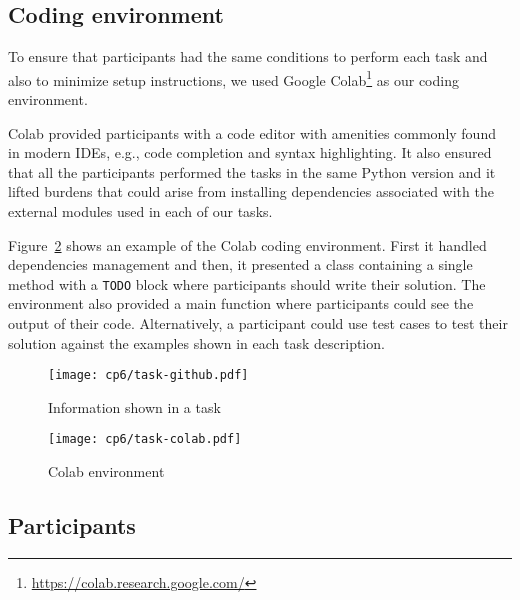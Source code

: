 \subsection{Coding environment}
\label{cp6:coding-environment}



To ensure that participants had the same conditions to perform each task
and also to minimize setup instructions, we used Google Colab\footnote{\url{https://colab.research.google.com/}} as our coding environment. 


Colab provided participants with a code editor with amenities commonly found in modern IDEs, e.g., code completion and syntax highlighting. It also ensured that all the participants 
performed the tasks in the same Python version and it lifted 
burdens that could arise from installing dependencies associated with the external modules used in each of our tasks. 


Figure~\ref{fig:nytimes-task-colab} shows an example of the Colab coding environment. 
First it handled dependencies management and then, 
it presented a class containing a single method with a \texttt{TODO} block where 
participants should write their solution. 
The environment also provided a main function where participants could see the output
of their code. Alternatively, a participant could use test cases to test their solution
against the examples shown in each task description.



\clearpage

\begin{figure}
    \centering
    \texttt{[image: cp6/task-github.pdf]}
    \caption{Information shown in a task}
    \label{fig:nytimes-task-github}
\end{figure}



\clearpage

\begin{figure}
    \centering
    \texttt{[image: cp6/task-colab.pdf]}
    \caption{Colab environment}
    \label{fig:nytimes-task-colab}
\end{figure}



\clearpage



\subsection{Participants}
\label{cp6:participants}


